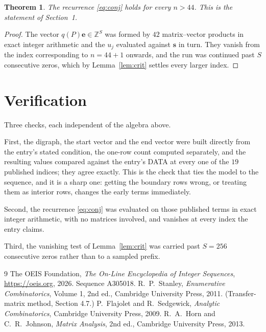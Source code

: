 \documentclass[11pt,a4paper]{article}
\theoremstyle{plain}
\newtheorem{theorem}{Theorem}
\theoremstyle{definition}
\begin{document}
\begin{theorem}
The recurrence \eqref{eq:conj} holds for every $n>44$. This is the statement of
Section~1.
\end{theorem}

\begin{proof}
The vector $q(P)\mathbf{e}\in\mathbb{Z}^{S}$ was formed by $42$ matrix--vector
products in exact integer arithmetic and the $u_j$ evaluated against $\mathbf{s}$ in turn.
They vanish from the index corresponding to $n=44+1$ onwards, and the run was continued
past $S$ consecutive zeros, which by Lemma~\ref{lem:crit} settles every larger index.
\end{proof}

\section{Verification}

Three checks, each independent of the algebra above.

First, the digraph, the start vector and the end vector were built directly from the
entry's stated condition, the one-row count computed separately, and the resulting values
compared against the entry's DATA at every one of the $19$ published indices; they
agree exactly. This is the check that ties the model to the sequence, and it is a sharp one:
getting the boundary rows wrong, or treating them as interior rows, changes the early terms
immediately.

Second, the recurrence \eqref{eq:conj} was evaluated on those published terms in exact
integer arithmetic, with no matrices involved, and vanishes at every index the entry claims.

Third, the vanishing test of Lemma~\ref{lem:crit} was carried past $S=256$ consecutive
zeros rather than to a sampled prefix.

\begin{thebibliography}{9}
 The OEIS Foundation, \emph{The On-Line Encyclopedia of Integer
Sequences}, \url{https://oeis.org}, 2026. Sequence A305018.
 R.~P.~Stanley, \emph{Enumerative Combinatorics}, Volume 1, 2nd ed.,
Cambridge University Press, 2011. (Transfer-matrix method, Section 4.7.)
 P.~Flajolet and R.~Sedgewick, \emph{Analytic Combinatorics}, Cambridge
University Press, 2009.
 R.~A.~Horn and C.~R.~Johnson, \emph{Matrix Analysis}, 2nd ed., Cambridge
University Press, 2013.
\end{thebibliography}
\end{document}
